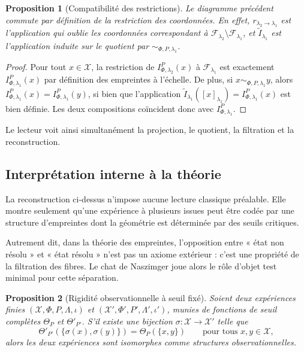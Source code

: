 \documentclass[11pt,a4paper]{article}
\newtheorem{proposition}{Proposition}
\begin{document}
\begin{appendices}
\begin{proposition}[Compatibilité des restrictions]
Le diagramme précédent commute par définition de la restriction des coordonnées. En effet, \(r_{\lambda_2\to\lambda_1}\) est l'application qui oublie les coordonnées correspondant à \(\mathcal F_{\lambda_2}\setminus\mathcal F_{\lambda_1}\), et \(\widetilde I_{\lambda_1}\) est l'application induite sur le quotient par \(\sim_{\Phi,P,\lambda_1}\).
\end{proposition}

\begin{proof}
Pour tout \(x\in\mathcal X\), la restriction de \(I_{\Phi,\lambda_2}^P(x)\) à \(\mathcal F_{\lambda_1}\) est exactement \(I_{\Phi,\lambda_1}^P(x)\) par définition des empreintes à l'échelle. De plus, si \(x\sim_{\Phi,P,\lambda_1}y\), alors \(I_{\Phi,\lambda_1}^P(x)=I_{\Phi,\lambda_1}^P(y)\), si bien que l'application \(\widetilde I_{\lambda_1}([x]_{\lambda_1})=I_{\Phi,\lambda_1}^P(x)\) est bien définie. Les deux compositions coïncident donc avec \(I_{\Phi,\lambda_1}^P\).
\end{proof}

Le lecteur voit ainsi simultanément la projection, le quotient, la filtration et la reconstruction.

\subsection{Interprétation interne à la théorie}

La reconstruction ci-dessus n'impose aucune lecture classique préalable. Elle montre seulement qu'une expérience à plusieurs issues peut être codée par une structure d'empreintes dont la géométrie est déterminée par des seuils critiques.

Autrement dit, dans la théorie des empreintes, l'opposition entre « état non résolu » et « état résolu » n'est pas un axiome extérieur : c'est une propriété de la filtration des fibres. Le chat de Naszimger joue alors le rôle d'objet test minimal pour cette séparation.

\begin{proposition}[Rigidité observationnelle à seuil fixé]
Soient deux expériences finies \((\mathcal X,\Phi,P,\Lambda,\iota)\) et \((\mathcal X',\Phi',P',\Lambda',\iota')\), munies de fonctions de seuil complètes \(\Theta_P\) et \(\Theta'_{P'}\). S'il existe une bijection \(\sigma:\mathcal X\to\mathcal X'\) telle que
\[
\Theta'_{P'}(\{\sigma(x),\sigma(y)\})=\Theta_P(\{x,y\})
\qquad\text{pour tous }x,y\in\mathcal X,
\]
alors les deux expériences sont isomorphes comme structures observationnelles.
\end{proposition}


\end{appendices}
\end{document}
